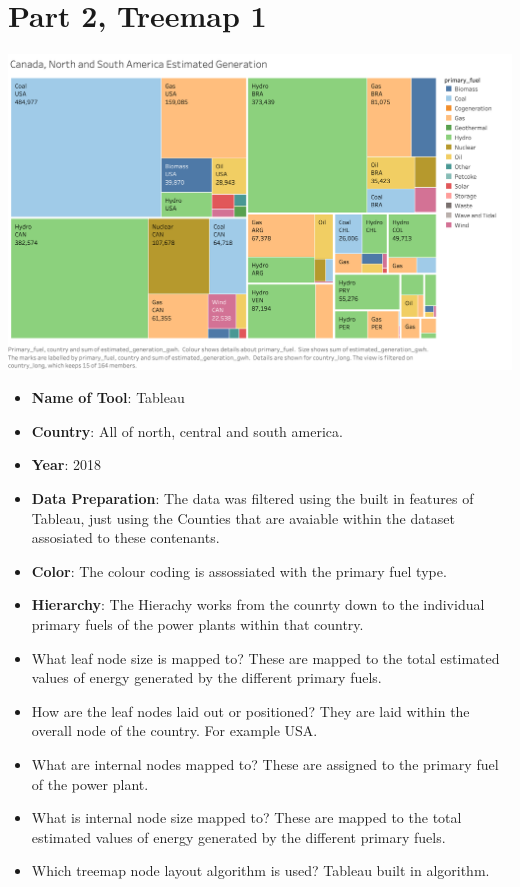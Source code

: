 \hypertarget{part-2-treemap-1}{%
\section{Part 2, Treemap 1}\label{part-2-treemap-1}}

	\centering
	\includegraphics[width=15cm]{AmericaEstGeneration}

	\begin{itemize}
		\tightlist
		\item
		  \textbf{Name of Tool}: Tableau
		\item
		  \textbf{Country}: All of north, central and south america.
		\item
		  \textbf{Year}: 2018
		\item
		  \textbf{Data Preparation}: The data was filtered using the built in features of Tableau, just using the Counties that are avaiable within the dataset assosiated to these contenants. 
		\item
		  \textbf{Color}: The colour coding is assossiated with the primary fuel type.
		\item
		  \textbf{Hierarchy}: The Hierachy works from the counrty down to the individual primary fuels of the power plants within that country.
		\item
		  What leaf node size is mapped to? These are mapped to the total estimated values of energy generated by the different primary fuels.
		\item
		  How are the leaf nodes laid out or positioned? They are laid within the overall node of the country. For example USA.
		\item
		  What are internal nodes mapped to? These are assigned to the primary fuel of the power plant.
		\item
		  What is internal node size mapped to? These are mapped to the total estimated values of energy generated by the different primary fuels.
		\item
		  Which treemap node layout algorithm is used?
		  Tableau built in algorithm.
	\end{itemize}
